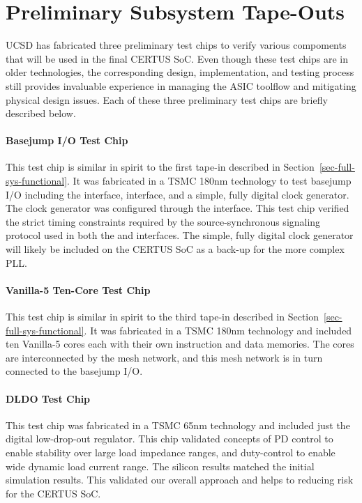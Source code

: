 
\section{Preliminary Subsystem Tape-Outs}

UCSD has fabricated three preliminary test chips to verify various
compoments that will be used in the final CERTUS SoC. Even though these
test chips are in older technologies, the corresponding design,
implementation, and testing process still provides invaluable experience
in managing the ASIC toolflow and mitigating physical design issues. Each
of these three preliminary test chips are briefly described below.

\paragraph{Basejump I/O Test Chip}
This test chip is similar in spirit to the first tape-in described in
Section~\ref{sec-full-sys-functional}. It was fabricated in a TSMC 180nm
technology to test basejump I/O including the  interface,
 interface, and a simple, fully digital clock generator. The
clock generator was configured through the  interface. This
test chip verified the strict timing constraints required by the
source-synchronous signaling protocol used in both the  and
 interfaces. The simple, fully digital clock generator will
likely be included on the CERTUS SoC as a back-up for the more complex
PLL.

\paragraph{Vanilla-5 Ten-Core Test Chip}
This test chip is similar in spirit to the third tape-in described in
Section~\ref{sec-full-sys-functional}. It was fabricated in a TSMC 180nm
technology and included ten Vanilla-5 cores each with their own
instruction and data memories. The cores are interconnected by the mesh
network, and this mesh network is in turn connected to the basejump I/O.

\paragraph{DLDO Test Chip}
This test chip was fabricated in a TSMC 65nm technology and included just
the digital low-drop-out regulator. This chip validated concepts of PD
control to enable stability over large load impedance ranges, and
duty-control to enable wide dynamic load current range. The silicon
results matched the initial simulation results. This validated our
overall approach and helps to reducing risk for the CERTUS SoC.

